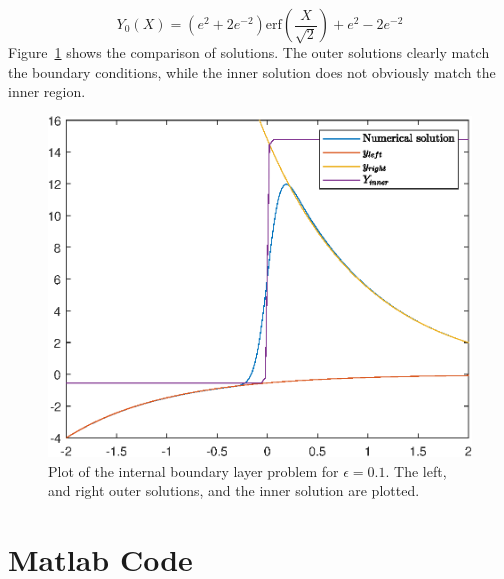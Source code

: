 \documentclass{X:/Documents/Coding/Latex/myassignment}
\begin{document}
\begin{enumerate}
	\[\boxed{Y_0(X) = \left(e^{2} + 2e^{-2}\right)\mathrm{erf}(\frac{X}{\sqrt{2}}) + e^{2} - 2e^{-2}}\]
	Figure~\ref{fig:q2} shows the comparison of solutions. The outer solutions clearly match the boundary conditions, while the inner solution does not obviously match the inner region. 

	\begin{figure}[tb]
		\centering
		\label{fig:q2}
		\includegraphics{TopicCA3Q2}
		\caption{Plot of the internal boundary layer problem for $\epsilon = 0.1$. The left, and right outer solutions, and the inner solution are plotted.}
	\end{figure}
\end{enumerate}

\section*{Matlab Code}


\clearpage

\end{document}

